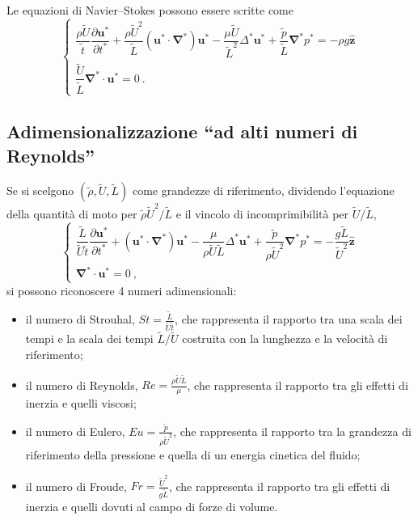 Le equazioni di Navier--Stokes possono essere scritte come
\begin{equation}
\begin{cases}
 \dfrac{\rho \tilde{U}}{\tilde{t}} \dfrac{\partial \bm{u}^*}{\partial t^*} + \dfrac{\rho \tilde{U}^2}{\tilde{L}} (\bm{u}^* \cdot \bm{\nabla}^*) \bm{u}^* - \dfrac{\mu \tilde{U}}{\tilde{L}^2} \Delta^* \bm{u}^* + \dfrac{\tilde{p}}{\tilde{L}} \bm{\nabla}^* p^* = -\rho g \bm{\hat{z}} \\
 \dfrac{\tilde{U}}{\tilde{L}}\bm{\nabla}^* \cdot \bm{u}^* = 0 \ .
\end{cases}
\end{equation}

\subsection{Adimensionalizzazione ``ad alti numeri di Reynolds''}
Se si scelgono $(\tilde{\rho},\tilde{U},\tilde{L})$ come grandezze di riferimento, dividendo l'equazione della quantità di moto per $\tilde{\rho} \tilde{U}^2 / \tilde{L}$ e il vincolo di incomprimibilità per $\tilde{U} / \tilde{L}$,
\begin{equation}
\begin{cases}
 \dfrac{\tilde{L}}{\tilde{U}\tilde{t}} \dfrac{\partial \bm{u}^*}{\partial t^*} + (\bm{u}^* \cdot \bm{\nabla}^*) \bm{u}^* - \dfrac{\mu }{ \rho \tilde{U} \tilde{L} } \Delta^* \bm{u}^* + \dfrac{\tilde{p}}{\rho \tilde{U}^2} \bm{\nabla}^* p^* = -\dfrac{g\tilde{L}}{\tilde{U}^2} \bm{\hat{z}} \\
 \bm{\nabla}^* \cdot \bm{u}^* = 0 \ ,
\end{cases}
\end{equation}
si possono riconoscere 4 numeri adimensionali:
\begin{itemize}
 \item il numero di Strouhal, $St = \frac{\tilde{L}}{\tilde{U}\tilde{t}}$, che rappresenta il rapporto tra una scala dei tempi e la scala dei tempi $\tilde{L}/\tilde{U}$ costruita con la lunghezza e la velocità di riferimento;
 \item il numero di Reynolds, $Re = \frac{\rho \tilde{U} \tilde{L} }{\mu}$, che rappresenta il rapporto tra gli effetti di inerzia e quelli viscosi;
 \item il numero di Eulero, $Eu = \frac{\tilde{p}}{\rho \tilde{U}^2}$, che rappresenta il rapporto tra la grandezza di riferimento della pressione e quella di un energia cinetica del fluido;
 \item il numero di Froude, $Fr = \frac{\tilde{U}^2}{g\tilde{L}}$, che rappresenta il rapporto tra gli effetti di inerzia e quelli dovuti al campo di forze di volume.
\end{itemize}
